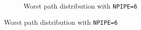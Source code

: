 \begin{figure}[htbp]
\begin{subfigure}{0.5\textwidth}
	    \caption{Worst path distribution with \texttt{NPIPE=6}}
	    \label{fig:hist6}
	\end{subfigure}
\end{figure}
